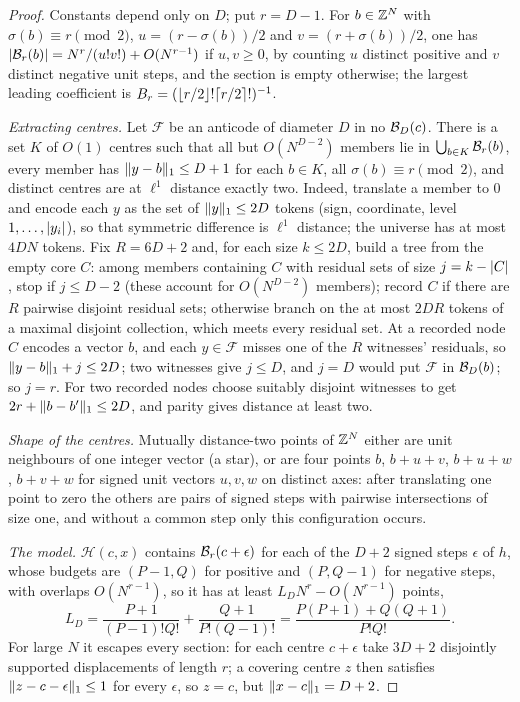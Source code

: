 \begin{proof}
Constants depend only on $D$; put $r=D-1$. For $b\in\mathbb{Z}^N$ with $\sigma(b)\equiv r\pmod2$,
$u=(r-\sigma(b))/2$ and $v=(r+\sigma(b))/2$, one has
$\lvert\mathcal{B}_r(b)\rvert=N^r/(u!v!)+O(N^{r-1})$ if $u,v\ge0$, by counting $u$ distinct positive and
$v$ distinct negative unit steps, and the section is empty otherwise; the largest leading
coefficient is $B_r=(\lfloor r/2\rfloor!\lceil r/2\rceil!)^{-1}$.

\emph{Extracting centres.} Let $\mathcal F$ be an anticode of diameter $D$ in no
$\mathcal{B}_D(c)$. There is a set $K$ of $O(1)$ centres such that all but $O(N^{D-2})$ members
lie in $\bigcup_{b\in K}\mathcal{B}_r(b)$, every member has $\lVert y-b\rVert_1\le D+1$ for each $b\in K$,
all $\sigma(b)\equiv r\pmod2$, and distinct centres are at $\ell^1$ distance exactly two.
Indeed, translate a member to $0$ and encode each $y$ as the set of $\lVert y\rVert_1\le2D$ tokens
(sign, coordinate, level $1,\dots,\lvert y_i\rvert$), so that symmetric difference is $\ell^1$
distance; the universe has at most $4DN$ tokens. Fix $R=6D+2$ and, for each size $k\le2D$,
build a tree from the empty core $C$: among members containing $C$ with residual sets of
size $j=k-\lvert C\rvert$, stop if $j\le D-2$ (these account for $O(N^{D-2})$ members); record $C$ if
there are $R$ pairwise disjoint residual sets; otherwise branch on the at most $2DR$ tokens
of a maximal disjoint collection, which meets every residual set. At a recorded node $C$
encodes a vector $b$, and each $y\in\mathcal F$ misses one of the $R$ witnesses' residuals,
so $\lVert y-b\rVert_1+j\le2D$; two witnesses give $j\le D$, and $j=D$ would put $\mathcal F$ in
$\mathcal{B}_D(b)$; so $j=r$. For two recorded nodes choose suitably disjoint witnesses to get
$2r+\lVert b-b'\rVert_1\le2D$, and parity gives distance at least two.

\emph{Shape of the centres.} Mutually distance-two points of $\mathbb{Z}^N$ either are unit
neighbours of one integer vector (a star), or are four points $b$, $b+u+v$, $b+u+w$,
$b+v+w$ for signed unit vectors $u,v,w$ on distinct axes: after translating one point to
zero the others are pairs of signed steps with pairwise intersections of size one, and
without a common step only this configuration occurs.

\emph{The model.} $\mathcal H(c,x)$ contains $\mathcal{B}_r(c+\epsilon)$ for each of the $D+2$
signed steps $\epsilon$ of $h$, whose budgets are $(P-1,Q)$ for positive and $(P,Q-1)$ for
negative steps, with overlaps $O(N^{r-1})$, so it has at least $L_DN^r-O(N^{r-1})$ points,
\[
 L_D=\frac{P+1}{(P-1)!Q!}+\frac{Q+1}{P!(Q-1)!}=\frac{P(P+1)+Q(Q+1)}{P!Q!} .
\]
For large $N$ it escapes every section: for each centre $c+\epsilon$ take $3D+2$ disjointly
supported displacements of length $r$; a covering centre $z$ then satisfies
$\lVert z-c-\epsilon\rVert_1\le1$ for every $\epsilon$, so $z=c$, but $\lVert x-c\rVert_1=D+2$.


\end{proof}
